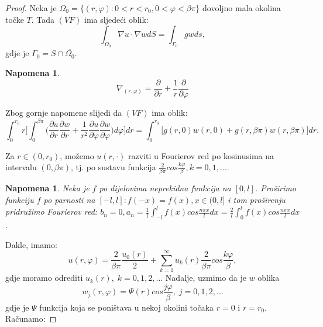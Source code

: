 \documentclass[a4paper,oneside,12pt]{memoir} %
\newtheorem{nap}[teorem]{Napomena}
\begin{document}
\begin{proof}
Neka je $\Omega_0 = \{ (r, \varphi): 0 < r < r_0, 0 < \varphi < \beta \pi \}$ dovoljno mala okolina točke $T$. Tada $(VF)$ ima sljedeći oblik:
\begin{equation*}
\int_{\Omega_0} \nabla u \cdot \nabla w dS = \int_{\Gamma_0} gw ds,
\end{equation*}
gdje je $\Gamma_0 = S \cap \overline{\Omega_0}$.

\begin{nap}
\begin{equation*}
\nabla_{(r,\varphi)} = \frac{\partial}{\partial r} + \frac{1}{r} \frac{\partial}{\partial \varphi}
\end{equation*}
\end{nap}

Zbog gornje napomene slijedi da $(VF)$ ima oblik:
\begin{equation} \label{eq:2}
\int_0^{r_0} r \big[ \int_0^{\beta \pi} \Big( \frac{\partial u}{\partial r} \frac{\partial w}{\partial r} + \frac{1}{r^2} \frac{\partial u}{\partial \varphi} \frac{\partial w}{\partial \varphi} \Big) d\varphi \big] dr = \int_0^{r_0} \big[ g(r,0) w(r,0) + g(r, \beta \pi) w(r, \beta \pi) \big] dr.
\end{equation}

Za $r \in (0, r_0)$, možemo $u(r, \cdot)$ razviti u Fourierov red po kosinusima na intervalu $(0, \beta \pi)$, tj. po sustavu funkcija $\frac{2}{\beta \pi} cos \frac{k \varphi}{\beta}, k = 0, 1, ...$.

\begin{nap}
Neka je $f$ po dijelovima neprekidna funkcija na $[0, l]$. Proširimo funkciju $f$ po parnosti na $[-l, l]: f(-x) = f(x), x \in (0, l]$ i tom proširenju pridružimo Fourierov red: $b_n = 0, a_n = \frac{1}{l} \int_{-l}^l f(x) cos\frac{n \pi x}{l} dx = \frac{2}{l} \int_0^l f(x) cos\frac{n \pi x}{l} dx$.
\end{nap}

Dakle, imamo:
\begin{equation*}
u(r, \varphi) = \frac{2}{\beta \pi} \frac{u_0(r)}{2} + \sum_{k=1}^{\infty} u_k(r) \frac{2}{\beta \pi} cos \frac{k \varphi}{\beta},
\end{equation*}
gdje moramo odrediti $u_k(r), \; k = 0, 1, 2, ...$ \newline
Nadalje, uzmimo da je $w$ oblika
\begin{equation*}
w_j(r, \varphi) = \Psi(r) cos\frac{j \varphi}{\beta}, \; j = 0, 1, 2, ...
\end{equation*}
gdje je $\Psi$ funkcija koja se poništava u nekoj okolini točaka $r = 0$ i $r = r_0$.
Računamo:


\end{proof}
\end{document}
